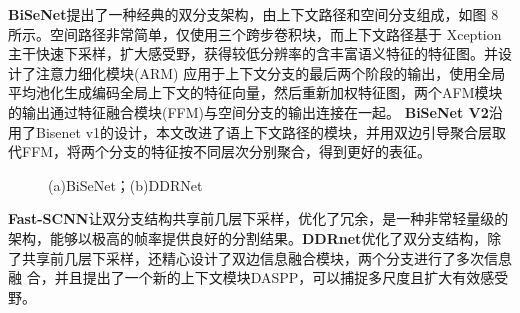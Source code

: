\documentclass[11pt]{article}
\begin{document}
\textbf{BiSeNet}\cite{ref6}提出了一种经典的双分支架构，由上下文路径和空间分支组成，如图 8 所示。空间路径非常简单，仅使用三个跨步卷积块，而上下文路径基于 Xception 主干快速下采样，扩大感受野，获得较低分辨率的含丰富语义特征的特征图。并设计了注意力细化模块(ARM) 应用于上下文分支的最后两个阶段的输出，使用全局平均池化生成编码全局上下文的特征向量，然后重新加权特征图，两个AFM模块的输出通过特征融合模块(FFM)与空间分支的输出连接在一起。
\textbf{BiSeNet V2}\cite{ref33}沿用了Bisenet v1的设计，本文改进了语上下文路径的模块，并用双边引导聚合层取代FFM，将两个分支的特征按不同层次分别聚合，得到更好的表征。
\begin{figure}[!h]
    \centering
    \centering
    \caption{(a)BiSeNet\cite{ref6}；(b)DDRNet\cite{ref39}}
\end{figure}


\textbf{Fast-SCNN}\cite{ref38}让双分支结构共享前几层下采样，优化了冗余，是一种非常轻量级的架构，能够以极高的帧率提供良好的分割结果。\textbf{DDRnet}\cite{ref39}优化了双分支结构，除了共享前几层下采样，还精心设计了双边信息融合模块，两个分支进行了多次信息融
合，并且提出了一个新的上下文模块DASPP，可以捕捉多尺度且扩大有效感受野。
\end{document}
